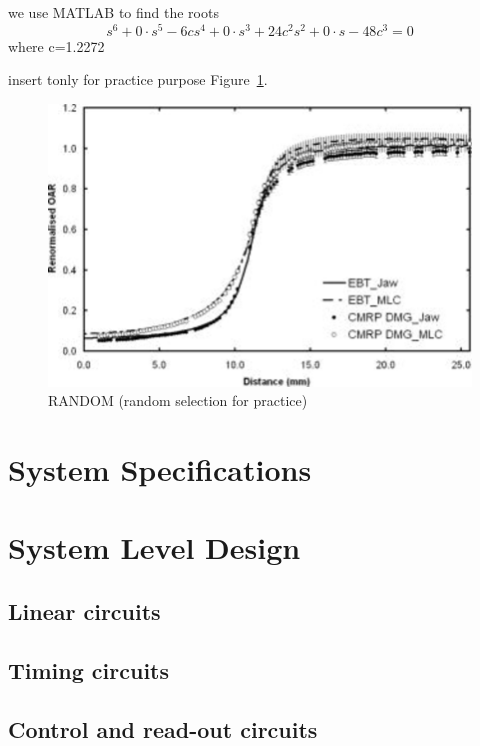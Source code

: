\documentclass[12pt,oneside,final]{siuethesis}
\theoremstyle{definition}
\begin{document}
we use MATLAB to find the roots
\begin{equation}
s^6+0 \cdot s^5-6cs^4+0 \cdot s^3+24c^2s^2+0 \cdot s-48c^3=0 
\end{equation}
where c=1.2272



insert tonly for practice purpose Figure~\ref{FIG:RANDOM-SELECT_1}.
\begin{figure}[htbp!]
\centering
\includegraphics[scale=.4,keepaspectratio=true]{./ch2_figures/random-select_1.png} 
\caption{RANDOM (random selection for practice)}
\label{FIG:RANDOM-SELECT_1}
\end{figure}

\section{System Specifications}

\section{System Level Design}

\subsection{Linear circuits}

\subsection{Timing circuits}

\subsection{Control and read-out circuits}
\end{document}
